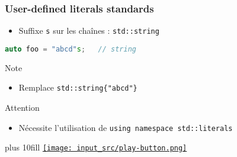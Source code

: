 \documentclass[C++.tex]{subfiles}
\begin{document}
\begin{frame}[fragile]
	\frametitle{User-defined literals standards}
	\begin{itemize}
		\item Suffixe \lstinline|s| sur les chaînes : \lstinline|std::string|
	\end{itemize}

	\begin{lstlisting}[language=C++]
auto foo = "abcd"s;   // string\end{lstlisting}

	\begin{block}{Note}
		\begin{itemize}
			\item Remplace \lstinline|std::string{"abcd"}|
		\end{itemize}
	\end{block}

	\begin{alertblock}{Attention}
		\begin{itemize}
			\item Nécessite l'utilisation de \lstinline|using namespace std::literals|
		\end{itemize}

	\end{alertblock}

	\vskip 10mm plus 10fill
	\hfill
	\href{https://godbolt.org/#g:!((g:!((g:!((h:codeEditor,i:(filename:'1',fontScale:14,fontUsePx:'0',j:1,lang:c%2B%2B,selection:(endColumn:1,endLineNumber:17,positionColumn:1,positionLineNumber:17,selectionStartColumn:1,selectionStartLineNumber:1,startColumn:1,startLineNumber:1),source:'%23include+%3Ciostream%3E%0A%23include+%3Cstring%3E%0A%23include+%3Ccassert%3E%0A%0Ausing+namespace+std::literals%3B%0A%0Aint+main()%0A%7B%0A++auto+s1+%3D+%22Abcd%22%3B%0A++auto+s2+%3D+%22Abcd%22s%3B%0A%0A%23if+1%0A++assert(typeid(s1)+%3D%3D+typeid(std::string))%3B%0A%23endif%0A++assert(typeid(s2)+%3D%3D+typeid(std::string))%3B%0A%7D%0A'),l:'5',n:'0',o:'C%2B%2B+source+%231',t:'0')),k:50,l:'4',n:'0',o:'',s:0,t:'0'),(g:!((h:executor,i:(argsPanelShown:'1',compilationPanelShown:'0',compiler:g122,compilerName:'',compilerOutShown:'0',execArgs:'',execStdin:'',fontScale:14,fontUsePx:'0',j:1,lang:c%2B%2B,libs:!((name:boost,ver:'175')),options:'-std%3Dc%2B%2B14+-Wall+-Wextra',source:1,stdinPanelShown:'1',tree:'1',wrap:'0'),l:'5',n:'0',o:'Executor+x86-64+gcc+12.2+(C%2B%2B,+Editor+%231)',t:'0')),header:(),k:50,l:'4',n:'0',o:'',s:0,t:'0')),l:'2',n:'0',o:'',t:'0')),version:4}{\texttt{[image: input\_src/play-button.png]}}
\end{frame}
\end{document}

